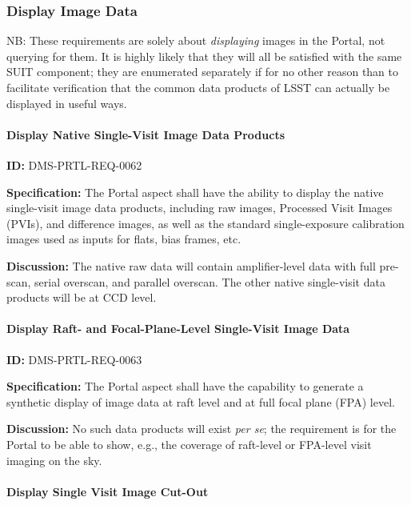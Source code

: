 \documentclass[SE,toc]{lsstdoc}
\begin{document}
\subsubsection{Display Image Data}

NB: These requirements are solely about \textit{displaying} images in the Portal, not querying for them. It is highly likely that they will all be satisfied with the same SUIT component; they are enumerated separately if for no other reason than to facilitate verification that the common data products of LSST can actually be displayed in useful ways.

\paragraph{Display Native Single-Visit Image Data Products}\hfill  %

\label{DMS-PRTL-REQ-0062}
\textbf{ID:} DMS-PRTL-REQ-0062

\textbf{Specification:}
The Portal aspect shall have the ability to display the native single-visit image data products, including raw images, Processed Visit Images (PVIs), and difference images, as well as the standard single-exposure calibration images used as inputs for flats, bias frames, etc.

\textbf{Discussion:}
The native raw data will contain amplifier-level data with full pre-scan, serial overscan, and parallel overscan.
The other native single-visit data products will be at CCD level.

\paragraph{Display Raft- and Focal-Plane-Level Single-Visit  Image Data}\hfill  %

\label{DMS-PRTL-REQ-0063}
\textbf{ID:} DMS-PRTL-REQ-0063

\textbf{Specification:}
The Portal aspect shall have the capability to generate a synthetic display of image data at raft level and at full focal plane (FPA) level.

\textbf{Discussion:}
No such data products will exist \textit{per se}; the requirement is for the Portal to be able to show, e.g., the coverage of raft-level or FPA-level visit imaging on the sky.

\paragraph{Display Single Visit Image Cut-Out}\hfill  %
\end{document}
